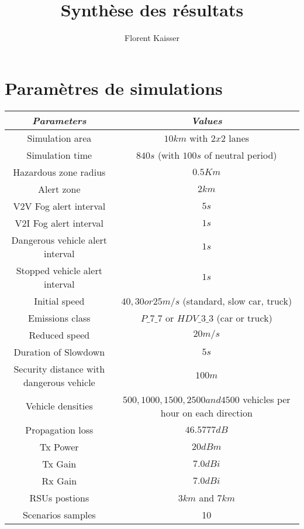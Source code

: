 \documentclass[a4paper,10pt]{report}
\title{Synthèse des résultats}
\author{Florent Kaisser}
\begin{document}
\maketitle

\begin{abstract}
\end{abstract}

\section{Paramètres de simulations}

\begin{table}[!t]
\label{tab:parametres}
\begin{center}
\begin{tabular}{|c||c|}
  \hline
   \emph{Parameters}&\emph{Values}\\
\hline
Simulation area& $10 km$ with $2x2$ lanes\\
  \hline
Simulation time& $840 s$ (with  $100 s$ of neutral period)\\
\hline
Hazardous zone radius& $0.5 Km$\\
\hline
Alert zone & $2 km$\\
\hline
V2V Fog alert interval & $5s$\\
\hline
V2I Fog alert interval & $1s$\\
\hline
Dangerous vehicle alert interval & $1s$\\
\hline
Stopped vehicle alert interval & $1s$\\
\hline
Initial speed & $40, 30 or 25 m/s$   (standard, slow car, truck) \\
\hline
Emissions class& $P\_7\_7$ or $HDV\_3\_3$  (car or truck) \\
\hline
Reduced speed & $20m/s$\\
\hline
Duration of Slowdown & $5s$\\
\hline
Security distance with dangerous vehicle & $100 m$\\
\hline
Vehicle densities & $500,1000,1500,2500 and 4500 $ vehicles per hour on each direction\\ 
\hline
Propagation loss & $46.5777dB$\\
\hline
Tx Power & $20 dBm$\\
\hline
Tx Gain & $ 7.0 dBi$\\
\hline
Rx Gain & $7.0 dBi$\\
\hline
RSUs postions  & $3 km$ and $7 km$ \\
\hline
Scenarios samples & 10 \\
\hline
 
\end{tabular}
\end{center}
\end{table}
\end{document}
